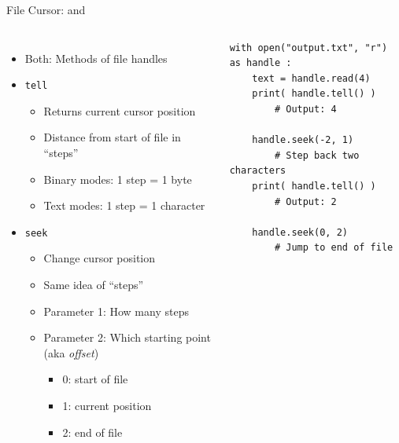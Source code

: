 \begin{frame}[fragile]{File Cursor:  and }
%
\begin{columns}[T]
\begin{itemize}
\item Both: Methods of file handles
\item	\texttt{tell}
	\begin{itemize}
	\item Returns current cursor position
	\item Distance from start of file in \enquote{steps}
	\item Binary modes: 1 step = 1 byte
	\item Text modes: 1 step = 1 character
	\end{itemize}
\item \texttt{seek}
	\begin{itemize}
	\item Change cursor position
	\item Same idea of \enquote{steps}
	\item Parameter 1: How many steps
	\item Parameter 2: Which starting point (aka \emph{offset})
		\begin{itemize}
		\item 0: start of file
		\item 1: current position
		\item 2: end of file
		\end{itemize}
	\end{itemize}
\end{itemize}
%
\begin{codebox}
\begin{verbatim}
with open("output.txt", "r") as handle :
    text = handle.read(4)
    print( handle.tell() )
        # Output: 4
    
    handle.seek(-2, 1)
        # Step back two characters
    print( handle.tell() )
        # Output: 2
    
    handle.seek(0, 2)
        # Jump to end of file
\end{verbatim}
\end{codebox}
%
\end{columns}
%
\end{frame}


